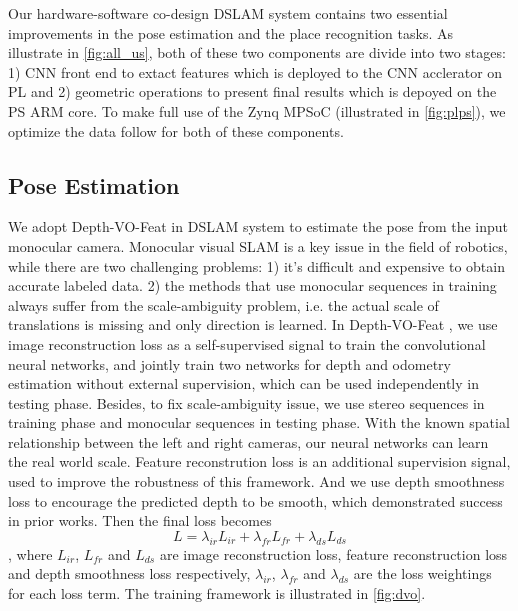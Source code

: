 \label{sec:hardsoft}
Our hardware-software co-design DSLAM system contains two essential improvements in the pose estimation and the place recognition tasks. As illustrate in \cref{fig:all_us}, both of these two components are divide into two stages: 1) CNN front end to extact features which is deployed to the CNN acclerator on PL and 2) geometric operations to present final results which is depoyed on the PS ARM core. To make full use of the Zynq MPSoC (illustrated in \cref{fig:plps}), we optimize the data follow for both of these components.

\subsection{Pose Estimation}
We adopt Depth-VO-Feat \cite{Zhan:2018e92} in DSLAM system to estimate the pose from the input monocular camera. Monocular visual SLAM is a key issue in the field of robotics, while there are two challenging problems: 1) it's difficult and expensive to obtain accurate labeled data. 2) the methods that use monocular sequences in training always suffer from the scale-ambiguity problem, i.e. the actual scale of translations is missing and only direction is learned. In Depth-VO-Feat \cite{Zhan:2018e92}, we use image reconstruction loss as a self-supervised signal to train the convolutional neural networks, and jointly train two networks for depth and odometry estimation without external supervision, which can be used independently in testing phase. Besides, to fix scale-ambiguity issue, we use stereo sequences in training phase and monocular sequences in testing phase. With the known spatial relationship between the left and right cameras, our neural networks can learn the real world scale. Feature reconstrution loss is an additional supervision signal, used to improve the robustness of this framework. And we use depth smoothness loss to encourage the predicted depth to be smooth, which demonstrated success in prior works. Then the final loss becomes $$L=\lambda_{ir}L_{ir}+\lambda_{fr}L_{fr}+\lambda_{ds}L_{ds}$$, where $L_{ir}$, $L_{fr}$ and $L_{ds}$ are image reconstruction loss, feature reconstruction loss and depth smoothness loss respectively, $\lambda_{ir}$, $\lambda_{fr}$ and $\lambda_{ds}$ are the loss weightings for each loss term. The training framework is illustrated in \cref{fig:dvo}.

